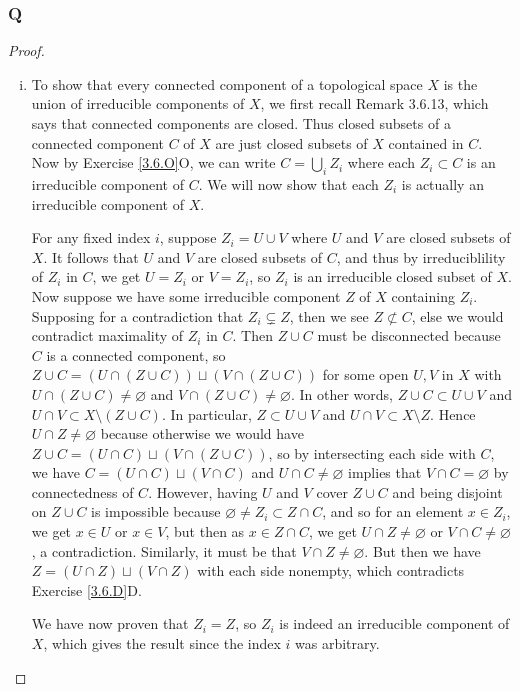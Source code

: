 \documentclass{article}
\newcommand{\nsubset}{\not \subset}
\let\emptyset\varnothing
\theoremstyle{definition} %
\begin{document}
\subsubsection{Q}\label{3.6.Q}
\begin{proof}
    \begin{enumerate}[(i)]
        \item To show that every connected component of a topological space $X$ is the union of irreducible components of $X$, we first recall Remark 3.6.13, which says that connected components are closed. Thus closed subsets of a connected component $C$ of $X$ are just closed subsets of $X$ contained in $C$. Now by Exercise \ref{3.6.O}O, we can write $C=\bigcup_i Z_i$ where each $Z_i \subset C$ is an irreducible component of $C$. We will now show that each $Z_i$ is actually an irreducible component of $X$. 
        
        For any fixed index $i$, suppose $Z_i = U \cup V$ where $U$ and $V$ are closed subsets of $X$. It follows that $U$ and $V$ are closed subsets of $C$, and thus by irreduciblility of $Z_i$ in $C$, we get $U=Z_i$ or $V=Z_i$, so $Z_i$ is an irreducible closed subset of $X$. Now suppose we have some irreducible component $Z$ of $X$ containing $Z_i$. Supposing for a contradiction that $Z_i\subsetneq Z$, then we see $Z\nsubset C$, else we would contradict maximality of $Z_i$ in $C$. Then $Z\cup C$ must be disconnected because $C$ is a connected component, so $Z\cup C = (U \cap (Z\cup C)) \sqcup (V \cap (Z\cup C))$ for some open $U,V$ in $X$ with $U\cap (Z\cup C) \ne \emptyset$ and $V\cap (Z\cup C) \ne \emptyset$. In other words, $Z\cup C\subset U\cup V$ and $U\cap V \subset X\setminus (Z\cup C)$. In particular, $Z\subset U\cup V$ and $U\cap V \subset X\setminus Z$. Hence $U\cap Z \ne \emptyset$ because otherwise we would have $Z\cup C = (U\cap C)\sqcup (V\cap(Z\cup C))$, so by intersecting each side with $C$, we have $C=(U\cap C) \sqcup (V\cap C)$ and $U\cap C\ne \emptyset$ implies that $V\cap C = \emptyset$ by connectedness of $C$. However, having $U$ and $V$ cover $Z\cup C$ and being disjoint on $Z\cup C$ is impossible because $\emptyset \ne Z_i \subset Z\cap C$, and so for an element $x\in Z_i$, we get $x\in U$ or $x\in V$, but then as $x\in Z\cap C$, we get $U\cap Z \ne \emptyset$ or $V\cap C \ne \emptyset$, a contradiction. Similarly, it must be that $V\cap Z \ne \emptyset$. But then we have $Z=(U\cap Z)\sqcup (V\cap Z)$ with each side nonempty, which contradicts Exercise \ref{3.6.D}D.

        We have now proven that $Z_i=Z$, so $Z_i$ is indeed an irreducible component of $X$, which gives the result since the index $i$ was arbitrary.


\end{enumerate}
\end{proof}
\end{document}
